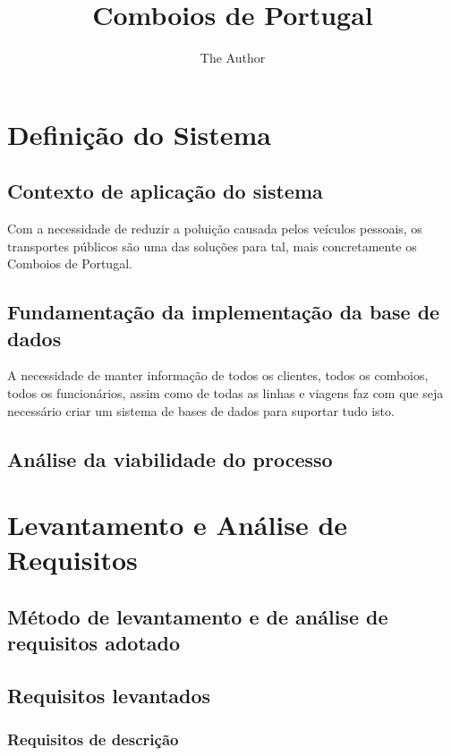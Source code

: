 \documentclass[11pt]{article} %
\title{Comboios de Portugal}
\author{The Author}
\begin{document}
\maketitle


\newpage
\tableofcontents
\newpage

\section{Definição do Sistema}


\subsection{Contexto de aplicação do sistema}
Com a necessidade de reduzir a poluição causada pelos veículos pessoais, os transportes públicos são uma das soluções para tal, mais concretamente os Comboios de Portugal.


\subsection{Fundamentação da implementação da base de dados}

A necessidade de manter informação de todos os clientes, todos os comboios, todos os funcionários, assim como de todas as linhas e viagens faz com que seja necessário criar um sistema de bases de dados para suportar tudo isto.


\subsection{Análise da viabilidade do processo}



\section{Levantamento e Análise de Requisitos}

\subsection{Método de levantamento e de análise de requisitos adotado}

\subsection{Requisitos levantados}

\subsubsection{Requisitos de descrição}
\end{document}
